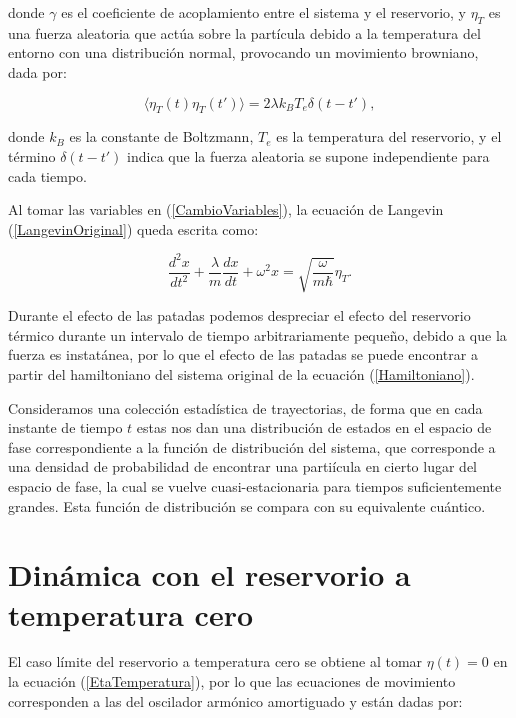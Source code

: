 \documentclass[letterpaper,12pt,oneside]{book}
\begin{document}
	\noindent donde $\gamma$ es el coeficiente de acoplamiento entre el sistema y el reservorio, y $\eta_T$ es una fuerza aleatoria que act\'ua sobre la part\'icula debido a la temperatura del entorno  con una distribuci\'on normal, provocando un movimiento browniano, dada por:
	
	\begin{equation}\label{EtaTemperatura}
		\langle \eta_T(t)\eta_T(t') \rangle = 2\lambda k_B T_e\delta(t-t'),
	\end{equation}
	
	\noindent donde $k_B$ es la constante de Boltzmann, $T_e$ es la temperatura del reservorio, y el t\'ermino $\delta(t-t')$ indica que la fuerza aleatoria se supone independiente para cada tiempo. 
	
	Al tomar las variables en (\ref{CambioVariables}), la ecuaci\'on de Langevin (\ref{LangevinOriginal}) queda escrita como:
	
	\begin{equation}\label{Langevin}
		\frac{d^2x}{dt^2} + \frac{\lambda}{m}\frac{dx}{dt} + \omega^2 x = \sqrt{\frac{\omega}{m\hbar}} \eta_T.
	\end{equation} 
	
	Durante el efecto de las patadas podemos despreciar el efecto del reservorio t\'ermico durante un intervalo de tiempo arbitrariamente pequeño, debido a que la fuerza es instat\'anea, por lo que el efecto de las patadas se puede encontrar a partir del hamiltoniano del sistema original de la ecuaci\'on (\ref{Hamiltoniano}).
	
	Consideramos una colecci\'on estad\'istica de trayectorias, de forma que en cada instante de tiempo $t$ estas nos dan una distribuci\'on de estados en el espacio de fase correspondiente a la funci\'on de distribuci\'on del sistema, que corresponde a una densidad de probabilidad de encontrar una parti\'icula en cierto lugar del espacio de fase, la cual se vuelve cuasi-estacionaria para tiempos suficientemente grandes. Esta funci\'on de distribuci\'on se compara con su equivalente cu\'antico.
	
	\section{Din\'amica con el reservorio a temperatura cero}
	
	El caso l\'imite del reservorio a temperatura cero se obtiene al tomar $\eta(t) = 0$ en la ecuaci\'on (\ref{EtaTemperatura}), por lo que las ecuaciones de movimiento corresponden a las del oscilador arm\'onico amortiguado y est\'an dadas por:
	
\end{document}
